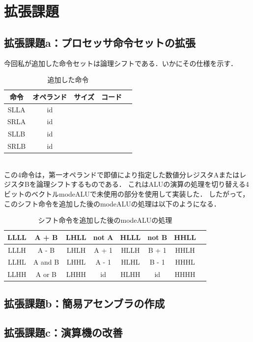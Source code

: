\documentclass[dvipdfmx]{jarticle}
\begin{document}
\section{拡張課題}
\subsection{拡張課題a：プロセッサ命令セットの拡張}
今回私が追加した命令セットは論理シフトである．いかにその仕様を示す．
\begin{table}[h]
  \centering
  \begin{tabular}{|c||c|c|c|c|}
    \hline
    命令 & オペランド & サイズ & コード\\\hline
    SLLA & id & & \\\hline
    SRLA & id & & \\\hline
    SLLB & id & & \\\hline
    SRLB & id & & \\\hline
  \end{tabular}
  \caption{追加した命令}
\end{table}
\\この4命令は，第一オペランドで即値により指定した数値分レジスタAまたはレジスタBを論理シフトするものである．
これはALUの演算の処理を切り替える4ビットのベクトルmodeALUで未使用の部分を使用して実装した．
したがって，このシフト命令を追加した後のmodeALUの処理は以下のようになる．
\begin{table}[h]
  \centering
  \begin{tabular}{|c|c|c|c|c|c|c|c|}
    \hline
    LLLL & A + B & LHLL & not A & HLLL & not B & HHLL & \\\hline
    LLLH & A - B & LHLH & A + 1 & HLLH  & B + 1 & HHLH & \\\hline
    LLHL & A and B & LHHL & A - 1 & HLHL  & B - 1 & HHHL & \\\hline
    LLHH & A or B & LHHH & id & HLHH & id & HHHH & \\\hline
  \end{tabular}
  \caption{シフト命令を追加した後のmodeALUの処理}
\end{table}
\subsection{拡張課題b：簡易アセンブラの作成}
\subsection{拡張課題c：演算機の改善}
\end{document}
